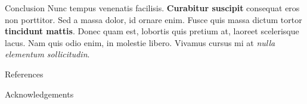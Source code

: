 \documentclass[final]{beamer}
\newlength{\onecolwid}
\begin{document}
\begin{frame}[t]
\begin{columns}[t]
\begin{column}{\onecolwid}
\begin{block}{Conclusion}
Nunc tempus venenatis facilisis. \textbf{Curabitur suscipit} consequat eros non porttitor. Sed a massa dolor, id ornare enim. Fusce quis massa dictum tortor \textbf{tincidunt mattis}. Donec quam est, lobortis quis pretium at, laoreet scelerisque lacus. Nam quis odio enim, in molestie libero. Vivamus cursus mi at \textit{nulla elementum sollicitudin}.

\end{block}


%
%


\begin{block}{References}

\nocite{*} %
\small{
\vspace{0.75in}}

\end{block}



\begin{block}{Acknowledgements}

\small{} \\


\end{block}
\end{column}
\end{columns}
\end{frame}
\end{document}
